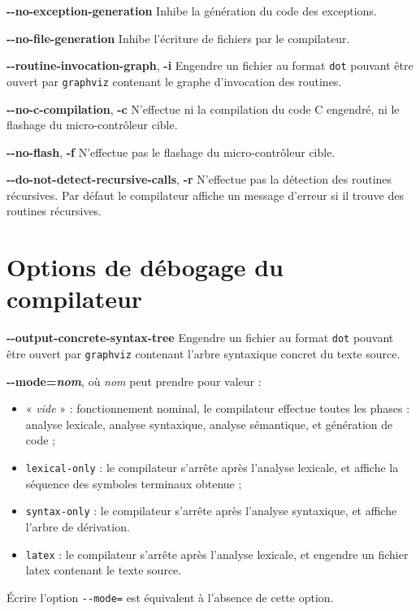
{\ttfamily\bfseries-{}-no-exception-generation} Inhibe la génération du code des exceptions.



{\ttfamily\bfseries-{}-no-file-generation} Inhibe l'écriture de fichiers par le compilateur.


{\ttfamily\bfseries-{}-routine-invocation-graph}, {\ttfamily\bfseries-i} Engendre un fichier au format \texttt{dot} pouvant être ouvert par \texttt{graphviz} contenant le graphe d'invocation des routines.

{\ttfamily\bfseries-{}-no-c-compilation}, {\ttfamily\bfseries-c} N'effectue ni la compilation du code C engendré, ni le flashage du micro-contrôleur cible.


{\ttfamily\bfseries-{}-no-flash}, {\ttfamily\bfseries-f} N'effectue pas le flashage du micro-contrôleur cible.


{\ttfamily\bfseries-{}-do-not-detect-recursive-calls}, {\ttfamily\bfseries-r} N'effectue pas la détection des routines récursives. Par défaut le compilateur affiche un message d'erreur si il trouve des routines récursives.






\section{Options de débogage du compilateur}


{\ttfamily\bfseries-{}-output-concrete-syntax-tree} Engendre un fichier au format \texttt{dot} pouvant être ouvert par \texttt{graphviz} contenant l'arbre syntaxique concret du texte source.


{\ttfamily\bfseries-{}-mode=\emph{nom}}, où \emph{nom} peut prendre pour valeur :
\begin{itemize}
  \item « \emph{vide} » : fonctionnement nominal, le compilateur effectue toutes les phases : analyse lexicale, analyse syntaxique, analyse sémantique, et génération de code ;
  \item \texttt{lexical-only} : le compilateur s'arrête après l'analyse lexicale, et affiche la séquence des symboles terminaux obtenue ;
  \item \texttt{syntax-only} : le compilateur s'arrête après l'analyse syntaxique, et affiche l'arbre de dérivation.
  \item \texttt{latex} : le compilateur s'arrête après l'analyse lexicale, et engendre un fichier latex contenant le texte source.
\end{itemize}

Écrire l'option \texttt{-{}-mode=} est équivalent à l'absence de cette option.
